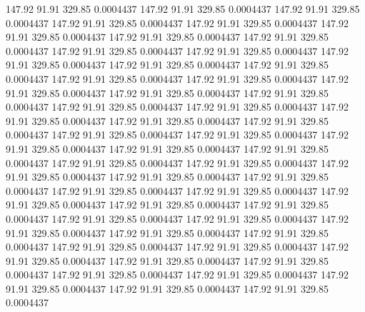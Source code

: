  147.92   91.91  329.85   0.0004437
 147.92   91.91  329.85   0.0004437
 147.92   91.91  329.85   0.0004437
 147.92   91.91  329.85   0.0004437
 147.92   91.91  329.85   0.0004437
 147.92   91.91  329.85   0.0004437
 147.92   91.91  329.85   0.0004437
 147.92   91.91  329.85   0.0004437
 147.92   91.91  329.85   0.0004437
 147.92   91.91  329.85   0.0004437
 147.92   91.91  329.85   0.0004437
 147.92   91.91  329.85   0.0004437
 147.92   91.91  329.85   0.0004437
 147.92   91.91  329.85   0.0004437
 147.92   91.91  329.85   0.0004437
 147.92   91.91  329.85   0.0004437
 147.92   91.91  329.85   0.0004437
 147.92   91.91  329.85   0.0004437
 147.92   91.91  329.85   0.0004437
 147.92   91.91  329.85   0.0004437
 147.92   91.91  329.85   0.0004437
 147.92   91.91  329.85   0.0004437
 147.92   91.91  329.85   0.0004437
 147.92   91.91  329.85   0.0004437
 147.92   91.91  329.85   0.0004437
 147.92   91.91  329.85   0.0004437
 147.92   91.91  329.85   0.0004437
 147.92   91.91  329.85   0.0004437
 147.92   91.91  329.85   0.0004437
 147.92   91.91  329.85   0.0004437
 147.92   91.91  329.85   0.0004437
 147.92   91.91  329.85   0.0004437
 147.92   91.91  329.85   0.0004437
 147.92   91.91  329.85   0.0004437
 147.92   91.91  329.85   0.0004437
 147.92   91.91  329.85   0.0004437
 147.92   91.91  329.85   0.0004437
 147.92   91.91  329.85   0.0004437
 147.92   91.91  329.85   0.0004437
 147.92   91.91  329.85   0.0004437
 147.92   91.91  329.85   0.0004437
 147.92   91.91  329.85   0.0004437
 147.92   91.91  329.85   0.0004437
 147.92   91.91  329.85   0.0004437
 147.92   91.91  329.85   0.0004437
 147.92   91.91  329.85   0.0004437
 147.92   91.91  329.85   0.0004437
 147.92   91.91  329.85   0.0004437
 147.92   91.91  329.85   0.0004437
 147.92   91.91  329.85   0.0004437
 147.92   91.91  329.85   0.0004437
 147.92   91.91  329.85   0.0004437
 147.92   91.91  329.85   0.0004437
